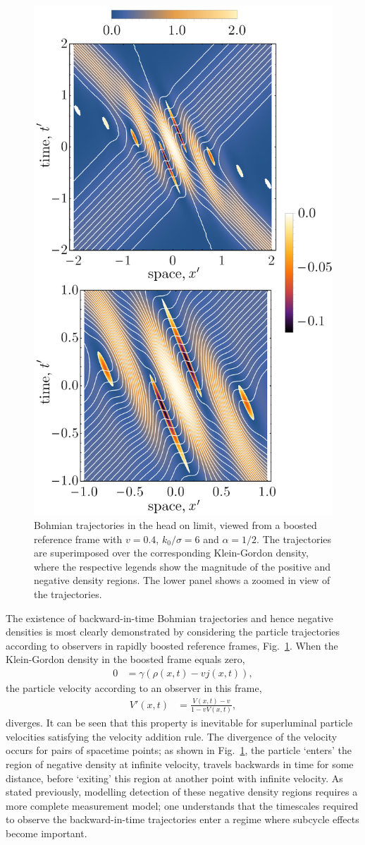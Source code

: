 \documentclass[12pt,prx,
,nofootinbib
,floatfix
,superscriptaddress
]{revtex4-2}
\begin{document}
\begin{figure}[ht]
    \centering
    \includegraphics[width=0.6\linewidth]{Fig5negative.png}
    \caption{Bohmian trajectories in the head on limit, viewed from a boosted reference frame with $v = 0.4$, $k_0/\sigma = 6$ and $\alpha = 1/2$. The trajectories are superimposed over the corresponding Klein-Gordon density, where the respective legends show the magnitude of the positive and negative density regions. The lower panel shows a zoomed in view of the trajectories. }
    \label{fig:negative}
\end{figure}

The existence of backward-in-time Bohmian trajectories and hence negative densities is most clearly demonstrated by considering the particle trajectories according to observers in rapidly boosted reference frames, Fig.\ \ref{fig:negative}. When the Klein-Gordon density in the boosted frame equals zero,
\begin{align}
    0 &= \gamma ( \rho(x,t) - vj(x,t) ) ,
\end{align}
the particle velocity according to an observer in this frame, 
\begin{align}
    V'(x,t) &= \frac{V(x,t) - v}{1 - v V(x,t)} ,
\end{align}
diverges. It can be seen that this property is inevitable for superluminal particle velocities satisfying the velocity addition rule. The divergence of the velocity occurs for pairs of spacetime points; as shown in Fig.\ \ref{fig:negative}, the particle `enters' the region of negative density at infinite velocity, travels backwards in time for some distance, before `exiting' this region at another point with infinite velocity. As stated previously, modelling detection of these negative density regions requires a more complete measurement model; one understands that the timescales required to observe the backward-in-time trajectories enter a regime where subcycle effects become important. 
\end{document}
